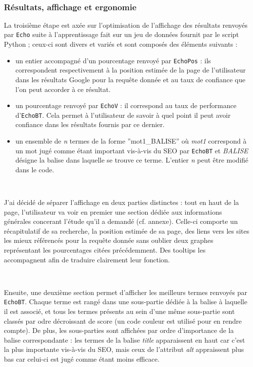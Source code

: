 \documentclass[12pt]{article}
\begin{document}
\

\subsubsection{Résultats, affichage et ergonomie}

La troisième étape est axée sur l'optimisation de l'affichage des résultats renvoyés par \texttt{Echo} suite à l'apprentissage fait sur un jeu de données fournit par le script \textsf{Python} ; ceux-ci sont divers et variés et sont composés des éléments suivants :
\begin{itemize}
	\item un entier accompagné d'un pourcentage renvoyé par \texttt{EchoPos} : ils correspondent respectivement à la position estimée de la page de l'utilisateur dans les résultats Google pour la requête donnée et au taux de confiance que l'on peut accorder à ce résultat.
	\item un pourcentage renvoyé par \texttt{EchoV} : il correspond au taux de performance d'\texttt{EchoBT}. Cela permet à l'utilisateur de savoir à quel point il peut avoir confiance dans les résultats fournis par ce dernier.
	\item un ensemble de \textit{n} termes de la forme ''mot1\_BALISE'' où \textit{mot1} correspond à un mot jugé comme étant important vis-à-vis du SEO par \texttt{EchoBT} et \textit{BALISE} désigne la balise dans laquelle se trouve ce terme. L'entier \textit{n} peut être modifié dans le code.
\end{itemize}

\

J'ai décidé de séparer l'affichage en deux parties distinctes : tout en haut de la page, l'utilisateur va voir en premier une section dédiée aux informations générales concerant l'étude qu'il a demandé (cf. annexe). Celle-ci comporte un récapitulatif de sa recherche, la position estimée de sa page, des liens vers les sites les mieux référencés pour la requête donnée sans oublier deux graphes représentant les pourcentages citées précédemment. Des tooltips les accompagnent afin de traduire clairement leur fonction.

\

Ensuite, une deuxième section permet d'afficher les meilleurs termes renvoyés par \texttt{EchoBT}. Chaque terme est rangé dans une sous-partie dédiée à la balise à laquelle il est associé, et tous les termes présents au sein d'une même sous-partie sont classés par odre décroissant de score (un code couleur est utilisé pour en rendre compte). De plus, les sous-parties sont affichées par ordre d'importance de la balise correspondante : les termes de la balise \textit{title} apparaissent en haut car c'est la plus importante vis-à-vis du SEO, mais ceux de l'attribut \textit{alt} appraissent plus bas car celui-ci est jugé comme étant moins efficace.
\end{document}
